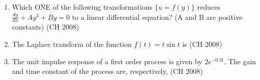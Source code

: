 \begin{enumerate}[label=\thesubsection.\arabic*,ref=\thesubsection.\theenumi]
\begin{enumerate}
\begin{multicols}{4}
\end{multicols}
\end{enumerate}
   \item Which ONE of the following transformations $\{ u = f(y) \}$ reduces $\frac{dy}{dx} + Ay^3 + By = 0$ to a linear differential equation? \quad (A and B are positive constants)
   \hfill{(CH 2008)}
\begin{enumerate}
\end{enumerate}

\item The Laplace transform of the function $f(t) = t \sin t$ is
\hfill{(CH 2008)}
\begin{enumerate}
\end{enumerate}
\item The unit impulse response of a first order process is given by $2 e^{-0.5 t}$. The gain and time constant of the process are, respectively,
\hfill{(CH 2008)}
\begin{enumerate}
\end{enumerate}


\end{enumerate}

